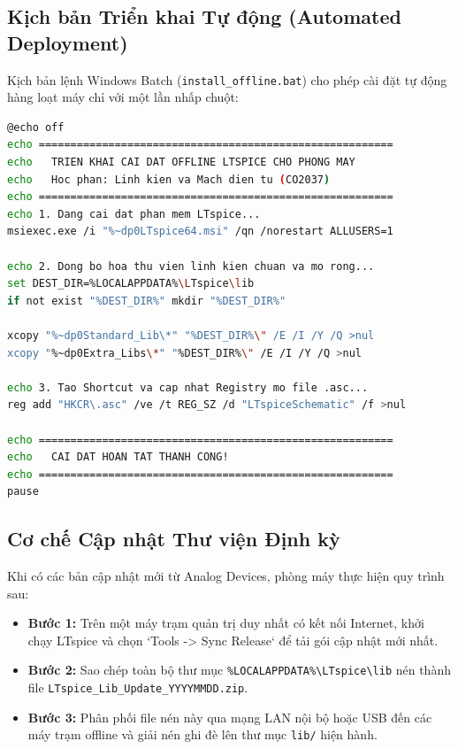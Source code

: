 \documentclass[12pt,a4paper]{report}
\begin{document}
\subsection{Kịch bản Triển khai Tự động (Automated Deployment)}
Kịch bản lệnh Windows Batch (\texttt{install\_offline.bat}) cho phép cài đặt tự động hàng loạt máy chỉ với một lần nhấp chuột:
\begin{lstlisting}[language=bash,caption={Kịch bản install\_offline.bat cho phòng máy thực hành}]
@echo off
echo ========================================================
echo   TRIEN KHAI CAI DAT OFFLINE LTSPICE CHO PHONG MAY
echo   Hoc phan: Linh kien va Mach dien tu (CO2037)
echo ========================================================
echo 1. Dang cai dat phan mem LTspice...
msiexec.exe /i "%~dp0LTspice64.msi" /qn /norestart ALLUSERS=1

echo 2. Dong bo hoa thu vien linh kien chuan va mo rong...
set DEST_DIR=%LOCALAPPDATA%\LTspice\lib
if not exist "%DEST_DIR%" mkdir "%DEST_DIR%"

xcopy "%~dp0Standard_Lib\*" "%DEST_DIR%\" /E /I /Y /Q >nul
xcopy "%~dp0Extra_Libs\*" "%DEST_DIR%\" /E /I /Y /Q >nul

echo 3. Tao Shortcut va cap nhat Registry mo file .asc...
reg add "HKCR\.asc" /ve /t REG_SZ /d "LTspiceSchematic" /f >nul

echo ========================================================
echo   CAI DAT HOAN TAT THANH CONG!
echo ========================================================
pause
\end{lstlisting}

\subsection{Cơ chế Cập nhật Thư viện Định kỳ}
Khi có các bản cập nhật mới từ Analog Devices, phòng máy thực hiện quy trình sau:
\begin{itemize}[noitemsep]
    \item \textbf{Bước 1:} Trên một máy trạm quản trị duy nhất có kết nối Internet, khởi chạy LTspice và chọn `Tools -> Sync Release` để tải gói cập nhật mới nhất.
    \item \textbf{Bước 2:} Sao chép toàn bộ thư mục \texttt{\%LOCALAPPDATA\%\textbackslash LTspice\textbackslash lib} nén thành file \texttt{LTspice\_Lib\_Update\_YYYYMMDD.zip}.
    \item \textbf{Bước 3:} Phân phối file nén này qua mạng LAN nội bộ hoặc USB đến các máy trạm offline và giải nén ghi đè lên thư mục \texttt{lib/} hiện hành.
\end{itemize}
\end{document}

